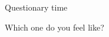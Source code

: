 \documentclass[13pt]{beamer}
\begin{document}
\begin{frame}{Questionary time}

  Which one do you feel like?

  \begin{figure}%
    \centering
    \qquad
  \end{figure}


\end{frame}
\end{document}
